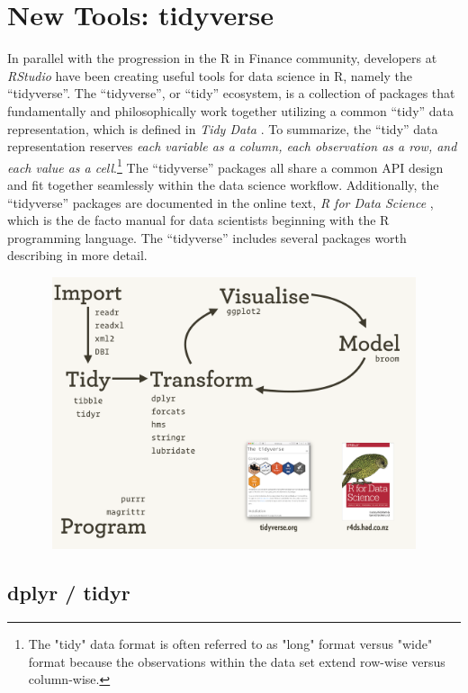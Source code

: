 \section{New Tools: tidyverse}\label{new-tools-tidyverse}

In parallel with the progression in the R in Finance community,
developers at \emph{RStudio} have been creating useful tools for data
science in R, namely the ``tidyverse''. The ``tidyverse'', or ``tidy''
ecosystem, is a collection of packages that fundamentally and
philosophically work together utilizing a common ``tidy'' data
representation, which is defined in \emph{Tidy Data} \citep{tidy-data}.
To summarize, the ``tidy'' data representation reserves \emph{each
variable as a column, each observation as a row, and each value as a
cell}.\footnote{The "tidy" data format is often referred to as "long" format versus "wide" format because the observations within the data set extend row-wise versus column-wise. }
The ``tidyverse'' packages all share a common API design and fit
together seamlessly within the data science workflow. Additionally, the
``tidyverse'' packages are documented in the online text, \emph{R for
Data Science} \citep{R4DS2017}, which is the de facto manual for data
scientists beginning with the R programming language. The ``tidyverse''
includes several packages worth describing in more detail.

\begin{figure}[htbp]
  \centering
  \includegraphics[width=12cm, height=8cm]{img/tidyverse}
  \tidyverse
\end{figure}

\subsection{dplyr / tidyr}\label{dplyr-tidyr}

